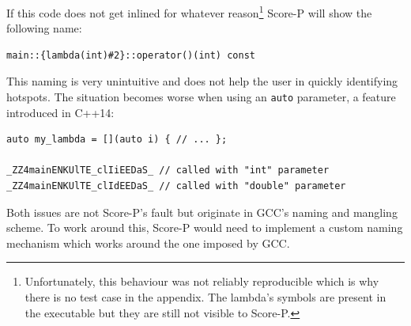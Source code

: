 If this code does not get inlined for whatever reason\footnote{Unfortunately, this behaviour was not reliably reproducible which is why there is no test case in the appendix. The lambda's symbols are present in the executable but they are still not visible to Score-P.} Score-P will show the following name:

\begin{lstlisting}
main::{lambda(int)#2}::operator()(int) const
\end{lstlisting}

This naming is very unintuitive and does not help the user in quickly identifying hotspots. The situation becomes worse when using an \texttt{auto} parameter, a feature introduced in C++14:

\begin{lstlisting}
auto my_lambda = [](auto i) { // ... };

_ZZ4mainENKUlTE_clIiEEDaS_ // called with "int" parameter
_ZZ4mainENKUlTE_clIdEEDaS_ // called with "double" parameter
\end{lstlisting}

Both issues are not Score-P's fault but originate in GCC's naming and mangling scheme. To work around this, Score-P would need to implement a custom naming mechanism which works around the one imposed by GCC.